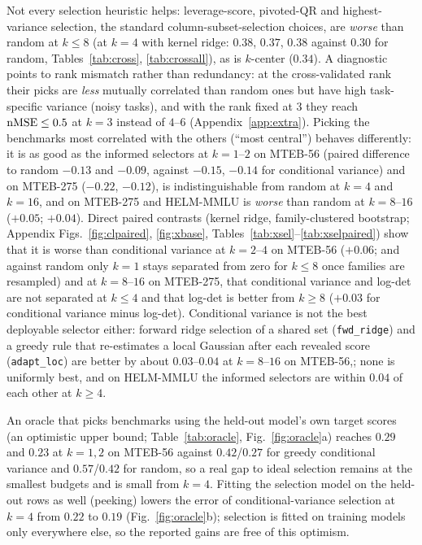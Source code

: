 Not every selection heuristic helps: leverage-score, pivoted-QR and highest-variance selection, the standard column-subset-selection choices, are \emph{worse} than random at $k\le8$ (at $k=4$ with kernel ridge: $0.38$, $0.37$, $0.38$ against $0.30$ for random, Tables~\ref{tab:cross}, \ref{tab:crossall}), as is $k$-center ($0.34$). A diagnostic points to rank mismatch rather than redundancy: at the cross-validated rank their picks are \emph{less} mutually correlated than random ones but have high task-specific variance (noisy tasks), and with the rank fixed at $3$ they reach $\mathrm{nMSE}\le0.5$ at $k=3$ instead of $4$--$6$ (Appendix~\ref{app:extra}). Picking the benchmarks most correlated with the others (``most central'') behaves differently: it is as good as the informed selectors at $k=1$--$2$ on MTEB-56 (paired difference to random $-0.13$ and $-0.09$, against $-0.15$, $-0.14$ for conditional variance) and on MTEB-275 ($-0.22$, $-0.12$), is indistinguishable from random at $k=4$ and $k=16$, and on MTEB-275 and HELM-MMLU is \emph{worse} than random at $k=8$--$16$ ($+0.05$; $+0.04$). Direct paired contrasts (kernel ridge, family-clustered bootstrap; Appendix Figs.~\ref{fig:clpaired}, \ref{fig:xbase}, Tables~\ref{tab:xsel}--\ref{tab:xselpaired}) show that it is worse than conditional variance at $k=2$--$4$ on MTEB-56 ($+0.06$; and against random only $k=1$ stays separated from zero for $k\le8$ once families are resampled) and at $k=8$--$16$ on MTEB-275, that conditional variance and log-det are not separated at $k\le4$ and that log-det is better from $k\ge8$ ($+0.03$ for conditional variance minus log-det). Conditional variance is not the best deployable selector either: forward ridge selection of a shared set (\texttt{fwd\_ridge}) and a greedy rule that re-estimates a local Gaussian after each revealed score (\texttt{adapt\_loc}) are better by about $0.03$--$0.04$ at $k=8$--$16$ on MTEB-56,; none is uniformly best, and on HELM-MMLU the informed selectors are within $0.04$ of each other at $k\ge4$.

An oracle that picks benchmarks using the held-out model's own target scores (an optimistic upper bound; Table~\ref{tab:oracle}, Fig.~\ref{fig:oracle}a) reaches $0.29$ and $0.23$ at $k=1,2$ on MTEB-56 against $0.42$/$0.27$ for greedy conditional variance and $0.57$/$0.42$ for random, so a real gap to ideal selection remains at the smallest budgets and is small from $k=4$. Fitting the selection model on the held-out rows as well (peeking) lowers the error of conditional-variance selection at $k=4$ from $0.22$ to $0.19$ (Fig.~\ref{fig:oracle}b); selection is fitted on training models only everywhere else, so the reported gains are free of this optimism.

